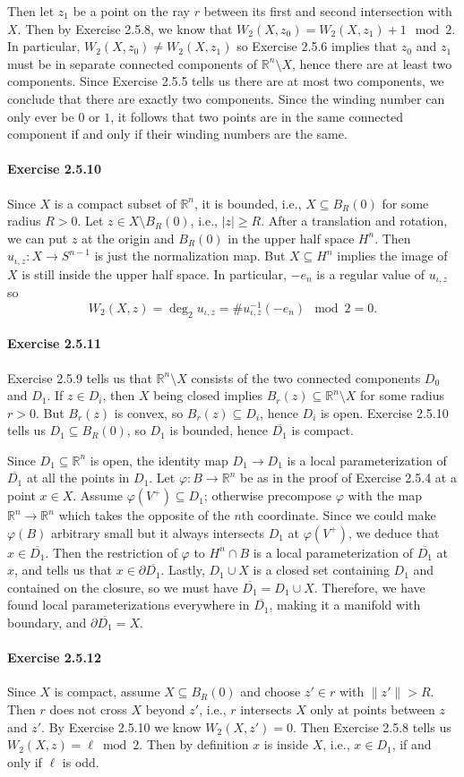 \documentclass[12pt]{article}
\newcommand{\pnum}[1]{\paragraph{#1}}
\theoremstyle{definition}
\newcommand{\R}{\mathbb{R}}
\renewcommand{\phi}{\varphi}
\newcommand{\<}{\langle}
\renewcommand{\>}{\rangle}
\newcommand{\clo}{\overline}
\newcommand{\seq}{\subseteq}
\newcommand{\bd}{\partial}
\begin{document}
Then let $z_1$ be a point on the ray $r$ between its first and second intersection with $X$.
Then by Exercise 2.5.8, we know that $W_2(X, z_0) = W_2(X, z_1) + 1 \mod{2}$.
In particular, $W_2(X, z_0) \ne W_2(X, z_1)$ so Exercise 2.5.6 implies that $z_0$ and $z_1$ must be in separate connected components of $\R^n \setminus X$, hence there are at least two components.
Since Exercise 2.5.5 tells us there are at most two components, we conclude that there are exactly two components.
Since the winding number can only ever be $0$ or $1$, it follows that two points are in the same connected component if and only if their winding numbers are the same.


\pnum{Exercise 2.5.10}

Since $X$ is a compact subset of $\R^n$, it is bounded, i.e., $X \seq B_R(0)$ for some radius $R > 0$.
Let $z \in X \setminus B_R(0)$, i.e., $|z| \geq R$.
After a translation and rotation, we can put $z$ at the origin and $B_R(0)$ in the upper half space $H^n$.
Then $u_{\iota, z} : X \to S^{n-1}$ is just the normalization map.
But $X \seq H^n$ implies the image of $X$ is still inside the upper half space.
In particular, $-e_n$ is a regular value of $u_{\iota, z}$ so
\[
    W_2(X, z) = \deg_2 u_{\iota, z} = \# u_{\iota, z}^{-1}(-e_n) \mod{2} = 0.
\]


\pnum{Exercise 2.5.11}

Exercise 2.5.9 tells us that $\R^n \setminus X$ consists of the two connected components $D_0$ and $D_1$.
If $z \in D_i$, then $X$ being closed implies $B_r(z) \seq \R^n \setminus X$ for some radius $r > 0$.
But $B_r(z)$ is convex, so $B_r(z) \seq D_i$, hence $D_i$ is open.
Exercise 2.5.10 tells us $D_1 \seq B_R(0)$, so $D_1$ is bounded, hence $\clo{D_1}$ is compact.


Since $D_1 \seq \R^n$ is open, the identity map $D_1 \to D_1$ is a local parameterization of $\clo{D_1}$ at all the points in $D_1$.
Let $\phi : B \to \R^n$ be as in the proof of Exercise 2.5.4 at a point $x \in X$.
Assume $\phi(V^+) \seq D_1$; otherwise precompose $\phi$ with the map $\R^n \to \R^n$ which takes the opposite of the $n$th coordinate.
Since we could make $\phi(B)$ arbitrary small but it always intersects $D_1$ at $\phi(V^+)$, we deduce that $x \in \clo{D_1}$.
Then the restriction of $\phi$ to $H^n \cap B$ is a local parameterization of $\clo{D_1}$ at $x$, and tells us that $x \in \bd\clo{D_1}$.
Lastly, $D_1 \cup X$ is a closed set containing $D_1$ and contained on the closure, so we must have $\clo{D_1} = D_1 \cup X$.
Therefore, we have found local parameterizations everywhere in $\clo{D_1}$, making it a manifold with boundary, and $\bd\clo{D_1} = X$.




\pnum{Exercise 2.5.12}

Since $X$ is compact, assume $X \seq B_R(0)$ and choose $z' \in r$ with $\|z'\| > R$.
Then $r$ does not cross $X$ beyond $z'$, i.e., $r$ intersects $X$ only at points between $z$ and $z'$.
By Exercise 2.5.10 we know $W_2(X, z') = 0$.
Then Exercise 2.5.8 tells us $W_2(X, z) = \ell \bmod 2$.
Then by definition $x$ is inside $X$, i.e., $x \in D_1$, if and only if $\ell$ is odd.
\end{document}
